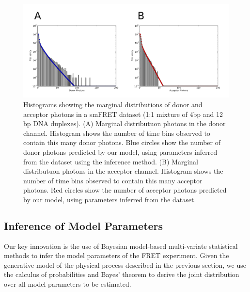 

\begin{figure}
   \begin{center}
      \includegraphics*[width=6in]{inference/marginal_distributions.pdf}
      \caption{Histograms showing the marginal distributions of donor and acceptor photons in a smFRET dataset (1:1 mixture of 4bp and 12 bp DNA duplexes). (A) Marginal distributuon photons in the donor channel. Histogram shows the number of time bins observed to contain this many donor photons. Blue circles show the number of donor photons predicted by our model, using parameters inferred from the dataset using the inference method. (B) Marginal distributuon photons in the acceptor channel. Histogram shows the number of time bins observed to contain this many acceptor photons. Red circles show the number of acceptor photons predicted by our model, using parameters inferred from the dataset.}
      \label{fig:marginals}
   \end{center}
\end{figure}

\clearpage

\subsection{Inference of Model Parameters}
Our key innovation is the use of Bayesian model-based multi-variate statistical methods to infer the model parameters of the FRET experiment. Given the generative model of the physical process described in the previous section, we use the calculus of probabilities and Bayes' theorem to derive the joint distribution over all model parameters to be estimated.

